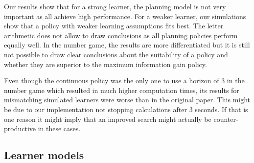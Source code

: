 Our results show that for a strong learner, the planning model is not very important as all achieve high performance. 
For a weaker learner, our simulations show that a policy with weaker learning assumptions fits best.
The letter arithmetic does not allow to draw conclusions as all planning policies perform equally well.
In the number game, the results are more differentiated but it is still not possible to draw clear conclusions about the suitability of a policy and whether they are superior to the maximum information gain policy.

Even though the continuous policy was the only one to use a horizon of 3 in the number game which resulted in much higher computation times, its results for mismatching simulated learners were worse than in the original paper. This might be due to our implementation not stopping calculations after 3 seconds. If that is one reason it might imply that an improved search might actually be counter-productive in these cases.


\subsection{Learner models}


